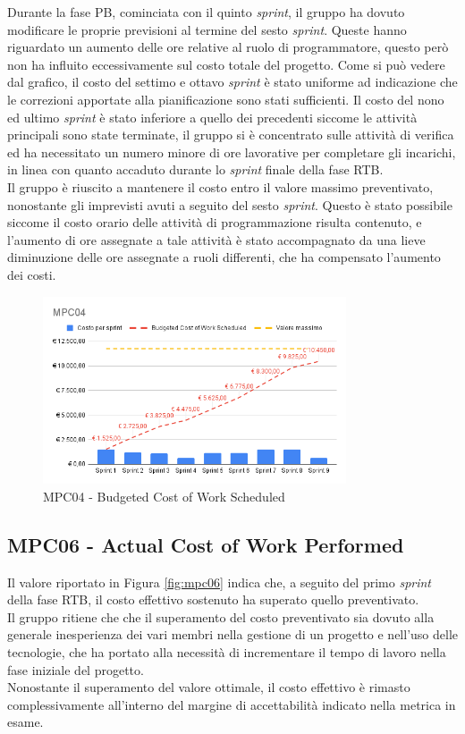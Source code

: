 Durante la fase PB, cominciata con il quinto \textit{sprint}, il gruppo ha dovuto modificare le proprie previsioni al termine del sesto \textit{sprint}.
Queste hanno riguardato un aumento delle ore relative al ruolo di programmatore, questo però non ha influito eccessivamente sul costo totale del progetto.
Come si può vedere dal grafico, il costo del settimo e ottavo \textit{sprint} è stato uniforme ad indicazione che le correzioni apportate alla pianificazione sono stati sufficienti.
Il costo del nono ed ultimo \textit{sprint} è stato inferiore a quello dei precedenti siccome le attività principali sono state terminate, il gruppo si è concentrato sulle attività di verifica ed ha necessitato un numero minore di ore lavorative per completare gli incarichi, in linea con quanto accaduto durante lo \textit{sprint} finale della fase RTB.\\
Il gruppo è riuscito a mantenere il costo entro il valore massimo preventivato, nonostante gli imprevisti avuti a seguito del sesto \textit{sprint}.
Questo è stato possibile siccome il costo orario delle attività di programmazione risulta contenuto, e l'aumento di ore assegnate a tale attività è stato accompagnato da una lieve diminuzione delle ore assegnate a ruoli differenti, che ha compensato l'aumento dei costi.
\begin{figure}[h]
    \centering
    \includegraphics[width=0.8\textwidth]{img/MPC04.png}
    \caption{MPC04 - Budgeted Cost of Work Scheduled}
    \label{fig:mpc04}
\end{figure}


\subsection{MPC06 - Actual Cost of Work Performed}
\label{s:mpc06}
Il valore riportato in Figura \ref{fig:mpc06} indica che, a seguito del primo \textit{sprint} della fase RTB, il costo effettivo sostenuto ha superato quello preventivato.\\
Il gruppo ritiene che che il superamento del costo preventivato sia dovuto alla generale inesperienza dei vari membri nella gestione di un progetto e nell'uso delle tecnologie, che ha portato alla necessità di incrementare il tempo di lavoro nella fase iniziale del progetto.\\
Nonostante il superamento del valore ottimale, il costo effettivo è rimasto complessivamente all'interno del margine di accettabilità indicato nella metrica in esame.

